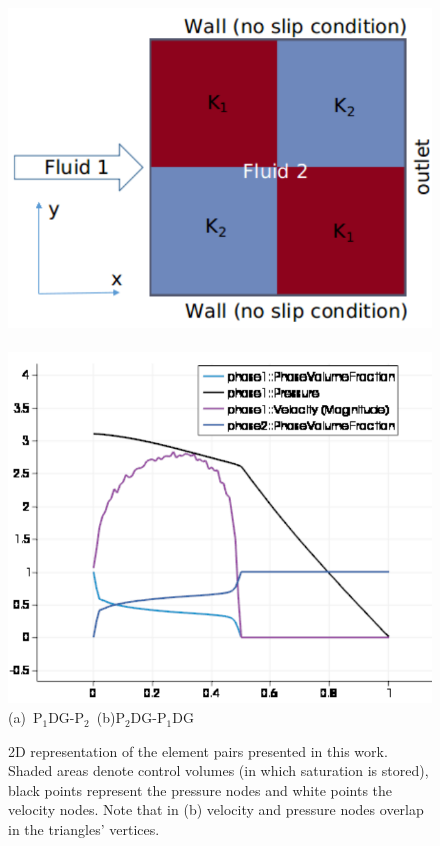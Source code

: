 \documentclass[preprint,authoryear,12pt]{elsarticle}
\newcommand{\PN}[2][error]{P$_{#1}$DG-P$_{#2}$}
\newcommand{\PNDG}[2][error]{P$_{#1}$DG-P$_{#2}$DG}
\begin{document}

\begin{figure}[h]
   \vbox{
       \hbox{\includegraphics[width=.5\textwidth]{./Pics/2b2_P1DGP2.pdf}
             \includegraphics[width=.5\textwidth]{./Pics/2b2_P1DGP2_plot.pdf}}
       \hbox{\hspace{3cm}(a) \PN[1]{2} \hspace{4.cm} (b)\PNDG[2]{1}}}
\caption{2D representation of the element pairs presented in this work. Shaded areas denote control volumes (in which saturation is   stored), black points represent the pressure nodes and white points the velocity nodes. Note that in (b) velocity and pressure nodes overlap in the triangles' vertices.}
    \label{fem_cv_represent_a}
\end{figure}
\end{document}
